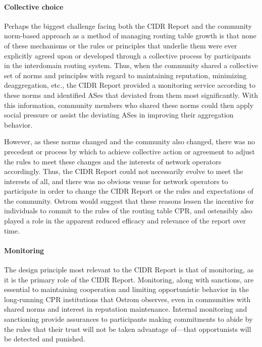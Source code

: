 \paragraph{Collective choice}

Perhaps the biggest challenge facing both the CIDR Report and the community
norm-based approach as a method of managing routing table growth is that none
of these mechanisms or the rules or principles that underlie them were ever
explicitly agreed upon or developed through a collective process by
participants in the interdomain routing system. Thus, when the community shared
a collective set of norms and principles with regard to maintaining reputation,
minimizing deaggregation, etc., the CIDR Report provided a monitoring service
according to these norms and identified ASes that deviated from them most
significantly.  With this information, community members who shared these norms
could then apply social pressure or assist the deviating ASes in improving
their aggregation behavior.

However, as these norms changed and the community also changed, there was no
precedent or process by which to achieve collective action or agreement to
adjust the rules to meet these changes and the interests of network operators
accordingly. Thus, the CIDR Report could not necessarily evolve to meet the
interests of all, and there was no obvious venue for network operators to
participate in order to change the CIDR Report or the rules and expectations of
the community. Ostrom would suggest that these reasons lessen the incentive for
individuals to commit to the rules of the routing table CPR, and ostensibly
also played a role in the apparent reduced efficacy and relevance of the report
over time.


\paragraph{Monitoring}

The design principle most relevant to the CIDR Report is that of monitoring, as
it is the primary role of the CIDR Report. Monitoring, along with sanctions,
are essential to maintaining cooperation and limiting opportunistic behavior in
the long-running CPR institutions that Ostrom observes, even in communities
with shared norms and interest in reputation maintenance. Internal monitoring
and sanctioning provide assurances to participants making commitments to abide
by the rules that their trust will not be taken advantage of---that
opportunists will be detected and punished.

